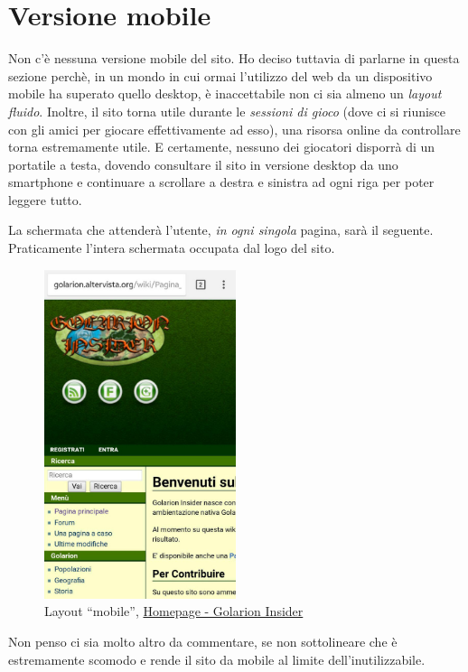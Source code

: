 \section{Versione mobile}

Non c'è nessuna versione mobile del sito. Ho deciso tuttavia di parlarne in questa sezione
perchè, in un mondo in cui ormai l'utilizzo del web da un dispositivo mobile ha superato
quello desktop, è inaccettabile non ci sia almeno un \emph{layout fluido}.
Inoltre, il sito torna utile durante le \emph{sessioni di gioco} (dove ci si riunisce con
gli amici per giocare effettivamente ad esso), una risorsa online da controllare
torna estremamente utile. E certamente, nessuno dei giocatori disporrà di un portatile a testa,
dovendo consultare il sito in versione desktop da uno smartphone e continuare a scrollare a destra e sinistra
ad ogni riga per poter leggere tutto.

La schermata che attenderà l'utente, \emph{in ogni singola} pagina, sarà il seguente. Praticamente l'intera schermata occupata dal
logo del sito.

\begin{figure}[hbt]
    \centering
    \includegraphics[width=0.5\textwidth]{img/mobile.jpg}
    \caption{Layout ``mobile'', \href{http://golarion.altervista.org/wiki/Pagina_principale}{Homepage - Golarion Insider}}
\end{figure} 

Non penso ci sia molto altro da commentare, se non sottolineare che è estremamente scomodo e rende il sito 
da mobile al limite dell'inutilizzabile.
